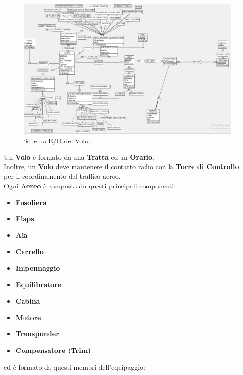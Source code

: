\begin{figure}[H] 
	\centering
	\includegraphics[width=1.2\linewidth, height=1.2\textheight, keepaspectratio]{./img/Schema_Concettuale/Volo.png}
	\caption{Schema E/R del Volo.}
	\label{fig:schema_volo}
\end{figure}

\textsf{\small Un \textbf{Volo} è formato da una \textbf{Tratta} ed un \textbf{Orario}.}\\

\textsf{\small Inoltre, un \textbf{Volo} deve mantenere il contatto radio con la \textbf{Torre di Controllo} per il coordinamento del traffico aereo.}\\

\textsf{\small Ogni \textbf{Aereo} è composto da questi principali componenti:}

\begin{itemize}
	\item \textbf{\small Fusoliera}
	\item \textbf{\small Flaps}
	\item \textbf{\small Ala}
	\item \textbf{\small Carrello}
	\item \textbf{\small Impennaggio}
	\item \textbf{\small Equilibratore}
	\item \textbf{\small Cabina}
	\item \textbf{\small Motore}
	\item \textbf{\small Transponder}
	\item \textbf{\small Compensatore (Trim)}
\end{itemize}

\textsf{\small ed è formato da questi membri dell'equipaggio:}


